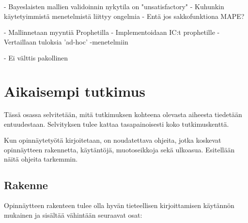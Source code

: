 \documentclass[english, 12pt, a4paper, sci, utf8, a-1b, online]{aaltothesis}
\begin{document}
- Bayeslaisten mallien validoinnin nykytila on "unsatisfactory"
- Kuhunkin käytetyimmistä menetelmistä liittyy ongelmia
- Entä jos sakkofunktiona MAPE?

- Mallinnetaan myyntiä Prophetilla
- Implementoidaan IC:t prophetille
- Vertaillaan tuloksia 'ad-hoc' -menetelmiin

- Ei välttis pakollinen

\section{Aikaisempi tutkimus}

Tässä osassa selvitetään, mitä tutkimuksen kohteena olevasta aiheesta tiedetään
entuudestaan. Selvityksen tulee kattaa tasapainoisesti koko tutkimuskenttä. 

Kun opinnäytetyötä kirjoitetaan, on noudatettava ohjeita, jotka koskevat
opinnäytteen rakennetta, käytäntöjä, muotoseikkoja sekä ulkoasua. Esitellään
näitä ohjeita tarkemmin.


\subsection{Rakenne}

Opinnäytteen rakenteen tulee olla hyvän tieteellisen kirjoittamisen käytännön
mukainen ja sisältää vähintään seuraavat osat:
\end{document}
